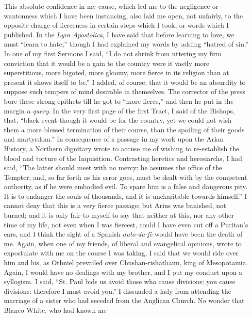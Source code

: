 This absolute confidence in my cause, which led me to the negligence or wantonness which I have been instancing, also laid me open,
not unfairly, to the opposite charge of fierceness in certain steps
which I took, or words which I published. In the \emph{Lyra Apostolica}, I have
said that before learning to love, we must ``learn to hate;''
though I had explained my words by adding ``hatred of sin.'' In
one of my first Sermons I said, ``I do not shrink from uttering my
firm conviction that it would be a gain to the country were it vastly
more superstitious, more bigoted, more gloomy, more fierce in its
religion than at present it shows itself to be.'' I added, of
course, that it would be an absurdity to suppose such tempers of mind
desirable in themselves. The corrector of the press bore these strong
epithets till he got to ``more fierce,'' and then he put in the
margin a \emph{query}. In the very first page of the first Tract, I said
of the Bishops, that, ``black event though it would be for the
country, yet we could not wish them a more blessed termination of their
course, than the spoiling of their goods and martyrdom.'' In
consequence of a passage in my work upon the Arian History, a Northern
dignitary wrote to accuse me of wishing to re-establish the blood and
torture of the Inquisition. Contrasting heretics and heresiarchs, I had
said, ``The latter should meet with no mercy: he assumes the office
of the Tempter; and, so far forth as his error goes, must be dealt with
by the competent authority, as if he were embodied evil. To spare him is
a false and dangerous pity. It is to endanger the souls of thousands,
and it is uncharitable towards himself.'' I cannot deny that this is
a very fierce passage; but Arius was banished, not burned; and it is
only fair to myself to say that neither at this, nor any other
time of my life, not even when I was fiercest, could I have even cut off
a Puritan's ears, and I think the sight of a Spanish \emph{auto-da-fè}
would have been the death of me. Again, when one of my friends, of
liberal and evangelical opinions, wrote to expostulate with me on the
course I was taking, I said that we would ride over him and his, as
Othniel prevailed over Chushan-rishathaim, king of Mesopotamia. Again, I
would have no dealings with my brother, and I put my conduct upon a
syllogism. I said, ``St. Paul bids us avoid those who cause
divisions; you cause divisions: therefore I must avoid you.'' I
dissuaded a lady from attending the marriage of a sister who had seceded
from the Anglican Church. No wonder that Blanco White, who had known me
